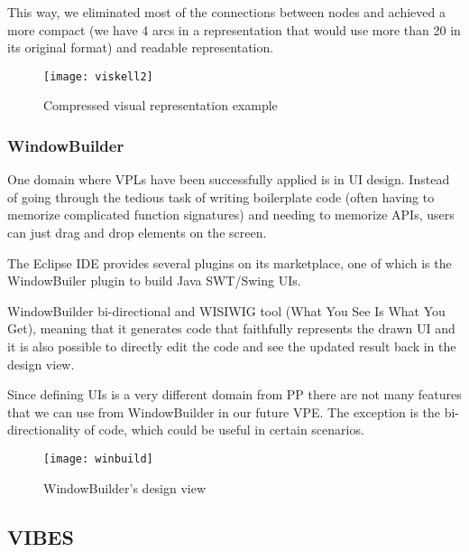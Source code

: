 \begin{itemsize}
This way, we eliminated most of the connections between nodes and achieved a
more compact (we have 4 arcs in a representation that would use more than 20 in
its original format) and readable representation.

\begin{figure}[t]
  \begin{center}
    \leavevmode
    \texttt{[image: viskell2]}
    \caption{Compressed visual representation example \cite{viskell}}
    \label{fig:viskell2}
  \end{center}
\end{figure}

\subsubsection{WindowBuilder}
\label{sec:winb}

One domain where VPLs have been successfully applied is in UI design. Instead of
going through the tedious task of writing boilerplate code (often having to
memorize complicated function signatures) and needing to memorize APIs, users
can just drag and drop elements on the screen.

The Eclipse IDE provides several plugins on its marketplace, one of which is the
WindowBuiler plugin \cite{winbuild} to build Java SWT/Swing UIs.

WindowBuilder bi-directional and WISIWIG tool (What You See Is What You Get), meaning
that it generates code that faithfully represents the drawn UI and it is also possible to
directly edit the code and see the updated result back in the design view.

Since defining UIs is a very different domain from PP there are not many features
that we can use from WindowBuilder in our future VPE. The exception is the
bi-directionality of code, which could be useful in certain scenarios.

\begin{figure}[t]
  \begin{center}
    \leavevmode
    \texttt{[image: winbuild]}
    \caption{WindowBuilder's design view \cite{winbuild}}
    \label{fig:winbuild}
  \end{center}
\end{figure}

\subsection{VIBES}
\label{sec:vibes}


\end{itemsize}
